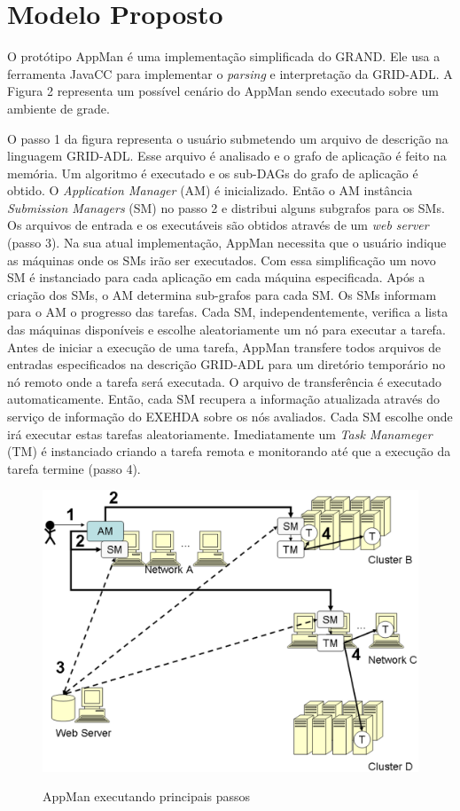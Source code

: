 \section{Modelo Proposto}
\label{cap:modelo proposto}


O protótipo AppMan é uma implementação simplificada do GRAND. Ele usa a ferramenta JavaCC para implementar o {\it parsing} e interpretação da GRID-ADL. A Figura 2 representa um possível cenário do AppMan sendo executado sobre um ambiente de grade.

O passo 1 da figura representa o usuário submetendo um arquivo de descrição na linguagem GRID-ADL. Esse arquivo é analisado e o grafo de aplicação é feito na memória. Um algoritmo é executado e os sub-DAGs do grafo de aplicação é obtido. O {\it Application Manager} (AM) é inicializado. Então o AM instância {\it Submission Managers} (SM) no passo 2 e distribui alguns subgrafos para os SMs. Os arquivos de entrada e os executáveis são obtidos através de um {\it web server} (passo 3). Na sua atual implementação, AppMan necessita que o usuário indique as máquinas onde os SMs irão ser executados. Com essa simplificação um novo SM é instanciado para cada aplicação em cada máquina especificada. Após a criação dos SMs, o AM determina sub-grafos para cada SM. Os SMs informam para o AM o progresso das tarefas. Cada SM, independentemente, verifica a lista das máquinas disponíveis e escolhe aleatoriamente um nó para executar a tarefa. Antes de iniciar a execução de uma tarefa, AppMan transfere todos arquivos de entradas especificados na descrição GRID-ADL para um diretório temporário no nó remoto onde a tarefa será executada. O arquivo de transferência é executado automaticamente. Então, cada SM recupera a informação atualizada através do serviço de informação do EXEHDA sobre os nós avaliados. Cada SM escolhe onde irá executar estas tarefas aleatoriamente. Imediatamente um {\it Task Manameger} (TM) é instanciado criando a tarefa remota e monitorando até que a execução da tarefa termine (passo 4).

\begin{figure}[hbtp]
\center
\includegraphics[scale=.1]{img/AppMan.eps}
\label{AppMan}
\caption{AppMan executando principais passos}
\end{figure}

